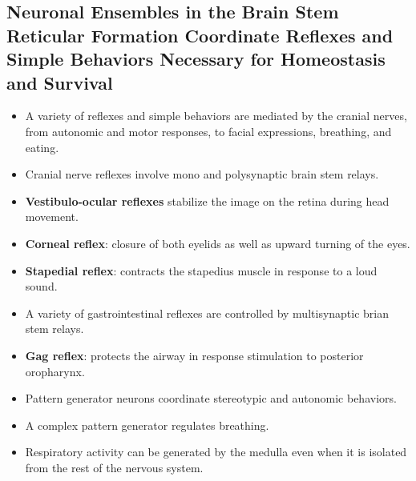 \documentclass[12pt,a4paper]{article}
\begin{document}
\subsection{Neuronal Ensembles in the Brain Stem Reticular Formation Coordinate Reflexes and Simple Behaviors Necessary for Homeostasis and Survival}
\begin{itemize}
    \item A variety of reflexes and simple behaviors are mediated by the cranial nerves, from autonomic and motor responses, to facial expressions, breathing, and eating.
    \item Cranial nerve reflexes involve mono and polysynaptic brain stem relays.
    \item \textbf{Vestibulo-ocular reflexes} stabilize the image on the retina during head movement.
    \item \textbf{Corneal reflex}: closure of both eyelids as well as upward turning of the eyes.
    \item \textbf{Stapedial reflex}: contracts the stapedius muscle in response to a loud sound.
    \item A variety of gastrointestinal reflexes are controlled by multisynaptic brian stem relays.
    \item \textbf{Gag reflex}: protects the airway in response stimulation to posterior oropharynx. 
    \item Pattern generator neurons coordinate stereotypic and autonomic behaviors.
    \item A complex pattern generator regulates breathing.
    \item Respiratory activity can be generated by the medulla even when it is isolated from the rest of the nervous system.
\end{itemize}
\end{document}
